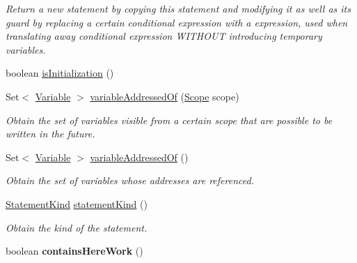 \begin{DoxyCompactItemize}
\begin{DoxyCompactList}\small\item\em Return a new statement by copying this statement and modifying it as well as its guard by replacing a certain conditional expression with a expression, used when translating away conditional expression W\+I\+T\+H\+O\+U\+T introducing temporary variables. \end{DoxyCompactList}\item 
boolean \hyperlink{classedu_1_1udel_1_1cis_1_1vsl_1_1civl_1_1model_1_1common_1_1statement_1_1CommonAssignStatement_a078d3453d2530e19dc0198fec8234cf5}{is\+Initialization} ()
\item 
Set$<$ \hyperlink{interfaceedu_1_1udel_1_1cis_1_1vsl_1_1civl_1_1model_1_1IF_1_1variable_1_1Variable}{Variable} $>$ \hyperlink{classedu_1_1udel_1_1cis_1_1vsl_1_1civl_1_1model_1_1common_1_1statement_1_1CommonAssignStatement_af477a53c531f3d7f2a8ffe58c1f56c53}{variable\+Addressed\+Of} (\hyperlink{interfaceedu_1_1udel_1_1cis_1_1vsl_1_1civl_1_1model_1_1IF_1_1Scope}{Scope} scope)
\begin{DoxyCompactList}\small\item\em Obtain the set of variables visible from a certain scope that are possible to be written in the future. \end{DoxyCompactList}\item 
Set$<$ \hyperlink{interfaceedu_1_1udel_1_1cis_1_1vsl_1_1civl_1_1model_1_1IF_1_1variable_1_1Variable}{Variable} $>$ \hyperlink{classedu_1_1udel_1_1cis_1_1vsl_1_1civl_1_1model_1_1common_1_1statement_1_1CommonAssignStatement_aa99a7081a2e5d3f085954c6f2cd4e907}{variable\+Addressed\+Of} ()
\begin{DoxyCompactList}\small\item\em Obtain the set of variables whose addresses are referenced. \end{DoxyCompactList}\item 
\hyperlink{enumedu_1_1udel_1_1cis_1_1vsl_1_1civl_1_1model_1_1IF_1_1statement_1_1Statement_1_1StatementKind}{Statement\+Kind} \hyperlink{classedu_1_1udel_1_1cis_1_1vsl_1_1civl_1_1model_1_1common_1_1statement_1_1CommonAssignStatement_a3e8f5b92fedd18788865606ca5ad1094}{statement\+Kind} ()
\begin{DoxyCompactList}\small\item\em Obtain the kind of the statement. \end{DoxyCompactList}\item 
\hypertarget{classedu_1_1udel_1_1cis_1_1vsl_1_1civl_1_1model_1_1common_1_1statement_1_1CommonAssignStatement_a7c0acd9ef90e496e987266c93a508fe7}{}boolean {\bfseries contains\+Here\+Work} ()\label{classedu_1_1udel_1_1cis_1_1vsl_1_1civl_1_1model_1_1common_1_1statement_1_1CommonAssignStatement_a7c0acd9ef90e496e987266c93a508fe7}

\end{DoxyCompactItemize}
